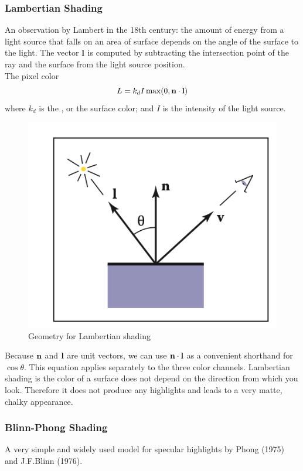 \documentclass[11pt]{article}
\begin{document}
\subsubsection{Lambertian Shading}
An observation by Lambert in the 18th century: the amount of energy from a light source that falls on an area of surface depends on the angle of the surface to the light.
The vector $\textbf{l}$ is computed by subtracting the intersection point of the ray and the surface from the light source position.\\
The pixel color
$$L = k_dI\max(0, \textbf{n} \cdot \textbf{l})$$
where $k_d$ is the , or the surface color; and $I$ is the intensity of the light source.
\begin{figure}[H]
	\centering
	\includegraphics[scale=0.7]{p1}
	\caption{Geometry for Lambertian shading}
\end{figure}
\remark
Because $\textbf{n}$ and $\textbf{l}$ are unit vectors, we can use $\textbf{n} \cdot \textbf{l}$ as a convenient shorthand for $\cos \theta$. This equation applies separately to the three color channels.
\remark
Lambertian shading is  the color of a surface does not depend on the direction from which you look. Therefore it does not produce any highlights and leads to a very matte, chalky appearance.

\subsubsection{Blinn-Phong Shading}
A very simple and widely used model for specular highlights by Phong (1975) and J.F.Blinn (1976).
\end{document}
